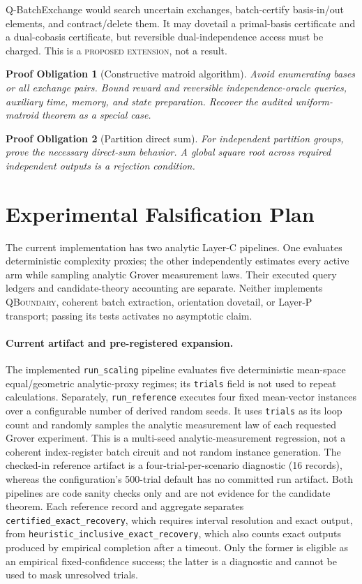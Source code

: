 \documentclass[10pt]{article}
\newtheorem{obligation}{Proof Obligation}
\theoremstyle{definition}
\newcommand{\status}[1]{\textsc{#1}}
\begin{document}
Q-BatchExchange would search uncertain exchanges, batch-certify basis-in/out
elements, and contract/delete them.  It may dovetail a primal-basis certificate
and a dual-cobasis certificate, but reversible dual-independence access must be
charged.  This is a \status{proposed extension}, not a result.

\begin{obligation}[Constructive matroid algorithm]
Avoid enumerating bases or all exchange pairs.  Bound reward and reversible
independence-oracle queries, auxiliary time, memory, and state preparation.
Recover the audited uniform-matroid theorem as a special case.
\end{obligation}

\begin{obligation}[Partition direct sum]
For independent partition groups, prove the necessary direct-sum behavior.  A
global square root across required independent outputs is a rejection condition.
\end{obligation}

\section{Experimental Falsification Plan}

The current implementation has two analytic Layer-C pipelines.  One evaluates
deterministic complexity proxies; the other independently estimates every
active arm while sampling analytic Grover measurement laws.  Their executed
query ledgers and candidate-theory accounting are separate.  Neither implements
\textsc{QBoundary}, coherent batch extraction, orientation dovetail, or Layer-P
transport; passing its tests activates no asymptotic claim.

\paragraph{Current artifact and pre-registered expansion.}
The implemented \texttt{run\_scaling} pipeline evaluates five deterministic
mean-space equal/geometric analytic-proxy regimes; its \texttt{trials} field is
not used to repeat calculations.  Separately, \texttt{run\_reference} executes
four fixed mean-vector instances over a configurable number of derived random
seeds.  It uses \texttt{trials} as its loop count and randomly samples the
analytic measurement law of each requested Grover experiment.  This is a
multi-seed analytic-measurement regression, not a coherent index-register batch
circuit and not random instance generation.  The checked-in reference artifact
is a four-trial-per-scenario diagnostic (16 records), whereas the configuration's
500-trial default has no committed run artifact.  Both pipelines are code sanity
checks only and are not evidence for the candidate theorem.  Each reference
record and aggregate separates \texttt{certified\_exact\_recovery}, which requires
interval resolution and exact output, from
\texttt{heuristic\_inclusive\_exact\_recovery}, which also counts exact outputs
produced by empirical completion after a timeout.  Only the former is eligible
as an empirical fixed-confidence success; the latter is a diagnostic and cannot
be used to mask unresolved trials.
\end{document}
